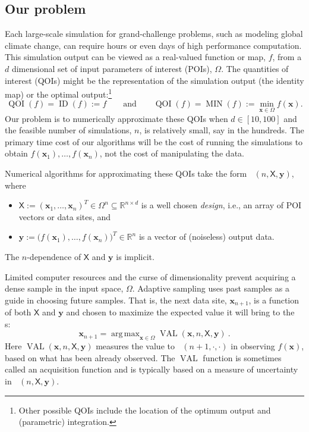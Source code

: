\documentclass[11pt]{NSFamsart}
\DeclareMathOperator*{\argmax}{arg\,max}
\DeclareMathOperator{\QOI}{QOI}
\DeclareMathOperator{\APP}{\widehat{\QOI}}
\DeclareMathOperator{\VAL}{VAL}
\DeclareMathOperator{\MIN}{MIN}
\DeclareMathOperator{\ID}{ID}
\newcommand{\reals}{{\mathbb{R}}}
\newcommand{\mX}{\mathsf{X}}
\newcommand{\bx}{{\boldsymbol{x}}}
\newcommand{\by}{{\boldsymbol{y}}}
\begin{document}
\subsection{Our problem}

Each large-scale simulation for grand-challenge problems, such as modeling global climate change, can require hours or even days of high performance computation.  This simulation output can be viewed as a real-valued function or map, $f$, from a $d$ dimensional set of input parameters of interest (POIs), $\Omega$.  The quantities of interest (QOIs) might be 
the representation of the simulation output (the identity map) or the optimal output:\footnote{Other possible QOIs include the location of the optimum output and (parametric) integration.}  
\begin{equation} \label{eq:ourQOIs}
    \QOI(f) = \ID(f) := f \qquad \text{and} \qquad \QOI(f) = \MIN(f) := \min_{\bx \in \Omega} f(\bx).
\end{equation}
Our problem is to numerically approximate these QOIs when $d \in [10, 100]$ and the feasible number of simulations, $n$, is relatively small, say in the hundreds.  The primary time cost of our algorithms will be the cost of running the simulations to obtain $f(\bx_1), \ldots, f(\bx_n)$, not the cost of manipulating the data.

Numerical algorithms for approximating these QOIs take the form $\APP(n,\mX,\by)$, where 
\begin{itemize}
    \item $\mX := (\bx_1, \ldots, \bx_n)^T \in \Omega^{n} \subseteq \reals^{n \times d}$ is a well chosen \emph{design}, i.e., an array of POI vectors or data sites, and
    
    \item $\by := \bigl(f(\bx_1), \ldots, f(\bx_n) \bigr)^T \in \reals^n$ is a vector of (noiseless) output data.
\end{itemize}   
The $n$-dependence of $\mX$ and $\by$ is implicit.  

Limited computer resources and the curse of dimensionality prevent acquiring a dense sample in the input space, $\Omega$. Adaptive sampling uses past samples as a guide in choosing future samples.   That is, the next data site, $\bx_{n+1}$, is a function of both $\mX$ and  $\by$ and chosen to maximize the expected value it will bring to the $\APP$s:
\begin{equation} \label{eq:nextsample}
    \bx_{n+1} = \argmax_{\bx \in \Omega} \VAL(\bx,n,\mX, \by)~.
\end{equation}
Here $\VAL(\bx,n,\mX, \by)$ measures the value to $\APP(n+1,\cdot,\cdot)$ in observing $f(\bx)$, based on what has been already observed.  The $\VAL$ function is sometimes called an acquisition function and is typically based on a measure of uncertainty in $\APP(n,\mX,\by)$.
\end{document}
